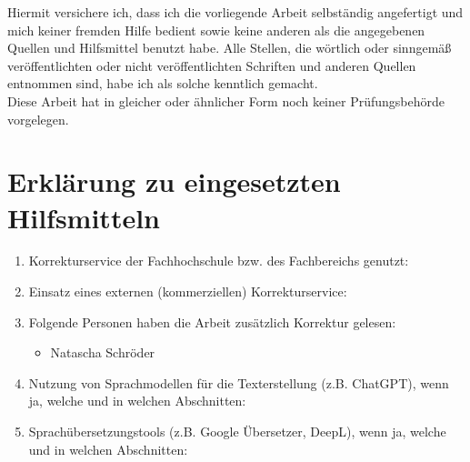 Hiermit versichere ich, dass ich die vorliegende Arbeit selbständig angefertigt und mich keiner fremden Hilfe bedient sowie keine anderen als die angegebenen Quellen und Hilfsmittel benutzt habe. Alle Stellen, die wörtlich oder sinngemäß veröffentlichten oder nicht veröffentlichten Schriften und anderen Quellen entnommen sind, habe ich als solche kenntlich gemacht.\\

Diese Arbeit hat in gleicher oder ähnlicher Form noch keiner Prüfungsbehörde vorgelegen.\\
\section*{Erklärung zu eingesetzten Hilfsmitteln}
\begin{enumerate}
	\item Korrekturservice der Fachhochschule bzw. des Fachbereichs genutzt:
	\item Einsatz eines externen (kommerziellen) Korrekturservice:
	\item Folgende Personen haben die Arbeit zusätzlich Korrektur gelesen:
	\begin{itemize}
		\item Natascha Schröder
	\end{itemize}
	\item Nutzung von Sprachmodellen für die Texterstellung (z.B. ChatGPT), wenn ja, welche und in welchen Abschnitten:
	\item Sprachübersetzungstools (z.B. Google Übersetzer, DeepL), wenn ja, welche und in welchen Abschnitten:

\end{enumerate}
